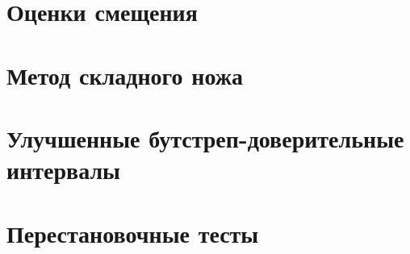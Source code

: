 \documentclass[12pt,a4paper,final]{report}
\begin{document}
\setcounter{chapter}{9}
\chapter{Оценки смещения}







\chapter{Метод складного ножа}








\setcounter{chapter}{13}
\chapter{Улучшенные бутстреп-доверительные интервалы}






\chapter{Перестановочные тесты}





\end{document}
